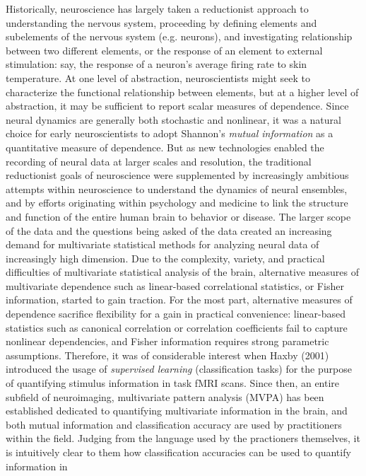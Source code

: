 \documentclass[12pt]{article}
\begin{document}
Historically, neuroscience has largely taken a reductionist approach
to understanding the nervous system, proceeding by defining elements
and subelements of the nervous system (e.g. neurons), and
investigating relationship between two different elements, or the
response of an element to external stimulation: say, the response of a
neuron's average firing rate to skin temperature.  At one level of
abstraction, neuroscientists might seek to characterize the functional
relationship between elements, but at a higher level of abstraction,
it may be sufficient to report scalar measures of dependence.  Since
neural dynamics are generally both stochastic and nonlinear, it was a
natural choice for early neuroscientists to adopt
Shannon's \emph{mutual information} as a quantitative measure of
dependence.  But as new technologies enabled the recording of neural
data at larger scales and resolution, the traditional reductionist
goals of neuroscience were supplemented by increasingly ambitious
attempts within neuroscience to understand the dynamics of neural
ensembles, and by efforts originating within psychology and medicine
to link the structure and function of the entire human brain to
behavior or disease.  The larger scope of the data and the questions
being asked of the data created an increasing demand for multivariate
statistical methods for analyzing neural data of increasingly high
dimension.  Due to the complexity, variety, and practical difficulties
of multivariate statistical analysis of the brain, alternative
measures of multivariate dependence such as linear-based correlational
statistics, or Fisher information, started to gain traction.  For the
most part, alternative measures of dependence sacrifice flexibility
for a gain in practical convenience: linear-based statistics such as
canonical correlation or correlation coefficients fail to capture
nonlinear dependencies, and Fisher information requires strong
parametric assumptions.  Therefore, it was of considerable interest
when Haxby (2001) introduced the usage of \emph{supervised learning}
(classification tasks) for the purpose of quantifying stimulus
information in task fMRI scans.  Since then, an entire subfield of
neuroimaging, multivariate pattern analysis (MVPA) has been
established dedicated to quantifying multivariate information in the
brain, and both mutual information and classification accuracy are
used by practitioners within the field.  Judging from the language
used by the practioners themselves, it is intuitively clear to them
how classification accuracies can be used to quantify information in
\end{document}
